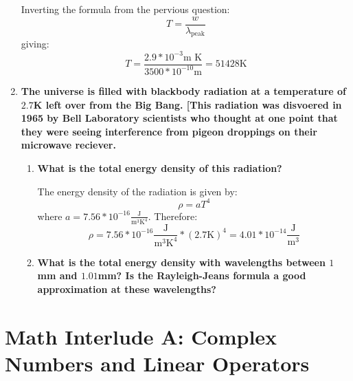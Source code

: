 \documentclass[9pt]{report}
\begin{document}
\begin{enumerate}
          Inverting the formula from the pervious question:
          \[
            T = \frac{w}{\lambda_\text{peak}}
          \]
          giving:
          \[
            T = \frac{2.9 * 10^{-3} \text{m K}}{ 3500 * 10^{-10} \text{m}} = 51428 \text{K}
          \]

        \item \textbf{The universe is filled with blackbody radiation at a temperature
            of $2.7$K left over from the Big Bang. [This radiation was disvoered in
          1965 by Bell Laboratory scientists who thought at one point that they were seeing
          interference from pigeon droppings on their microwave reciever.}
          \begin{enumerate}
          \item
            \textbf{What is the total energy density of this radiation?}

            The  energy density of the radiation is given by:
              \[
                \rho = a T^4
              \]
              where $a = 7.56 * 10^{-16} \frac{\text{J}}{\text{m}^3 \text{K}^4}$.
              Therefore:
              \[
                \rho = 7.56 * 10^{-16} \frac{\text{J}}{\text{m}^3 \text{K}^4} * (2.7\text{K})^4 = 4.01 * 10^{-14} \frac{\text{J}}{\text{m}^3}
              \]
          \item
            \textbf{What is the total energy density with wavelengths between
            $1$mm and $1.01$mm? Is the Rayleigh-Jeans formula a good approximation
            at these wavelengths?}
          \end{enumerate}
  \end{enumerate}
  \chapter{Math Interlude A: Complex Numbers and Linear Operators}
\end{document}
